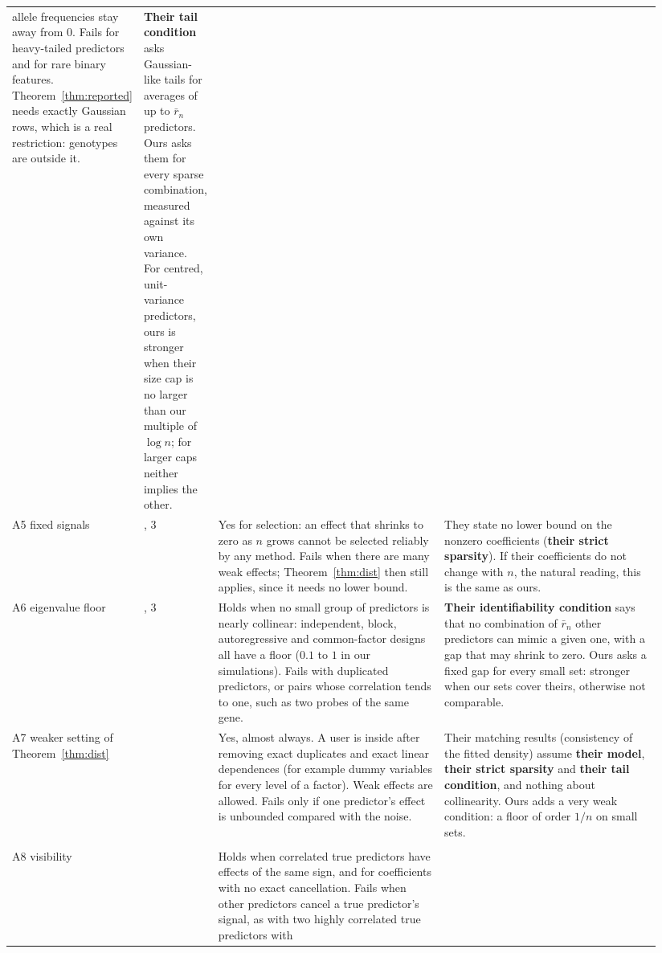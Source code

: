 \documentclass[11pt]{article}
\theoremstyle{plain}
\theoremstyle{definition}
\begin{document}
{\begin{longtable}{@{}>{\raggedright\arraybackslash}p{0.125\linewidth}>{\raggedright\arraybackslash}p{0.06\linewidth}>{\raggedright\arraybackslash}p{0.385\linewidth}>{\raggedright\arraybackslash}p{0.375\linewidth}@{}}
allele frequencies stay away from $0$. Fails for heavy-tailed predictors and for rare binary features.
Theorem~\ref{thm:reported} needs exactly Gaussian rows, which is a real restriction: genotypes are outside it. &
\textbf{Their tail condition} asks Gaussian-like tails for averages of up to $\bar r_n$ predictors. Ours asks them for
every sparse combination, measured against its own variance. For centred, unit-variance predictors, ours is stronger when their size cap is no larger than
our multiple of $\log n$; for larger caps neither implies the other. \\
A5 fixed signals & 1, 3 &
Yes for selection: an effect that shrinks to zero as $n$ grows cannot be selected reliably by any method. Fails
when there are many weak effects; Theorem~\ref{thm:dist} then still applies, since it needs no lower bound. &
They state no lower bound on the nonzero coefficients (\textbf{their strict sparsity}). If their coefficients do not
change with $n$, the natural reading, this is the same as ours. \\
A6 eigenvalue floor & 1, 3 &
Holds when no small group of predictors is nearly collinear: independent, block, autoregressive and common-factor
designs all have a floor ($0.1$ to $1$ in our simulations). Fails with duplicated predictors, or pairs whose
correlation tends to one, such as two probes of the same gene. &
\textbf{Their identifiability condition} says that no combination of $\bar r_n$ other predictors can mimic a given
one, with a gap that may shrink to zero. Ours asks a fixed gap for every small set: stronger when our sets cover
theirs, otherwise not comparable. \\
A7 weaker setting of Theorem~\ref{thm:dist} & 2 &
Yes, almost always. A user is inside after removing exact duplicates and exact linear dependences (for example
dummy variables for every level of a factor). Weak effects are allowed. Fails only if one predictor's effect is
unbounded compared with the noise. &
Their matching results (consistency of the fitted density) assume \textbf{their model}, \textbf{their strict sparsity}
and \textbf{their tail condition}, and nothing about collinearity. Ours adds a very weak condition: a floor of order
$1/n$ on small sets. \\
\midrule
\multicolumn{4}{@{}l}{\textbf{The reported model (Theorem~\ref{thm:reported} only)}} \\
A8 visibility & 3 &
Holds when correlated true predictors have effects of the same sign, and for coefficients with no exact cancellation.
Fails when other predictors cancel a true predictor's signal, as with two highly correlated true predictors with

\end{longtable}}
\end{document}
